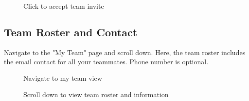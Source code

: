 \documentclass{article}
\begin{document}
\begin{figure}[H]
    \centering
    \caption{Click to accept team invite}
\end{figure}

\subsection{Team Roster and Contact}
Navigate to the "My Team" page and scroll down. Here, the team roster includes the email contact for all your teammates. Phone number is optional.

\begin{figure}[H]
    \centering
    \caption{Navigate to my team view}
\end{figure}

\begin{figure}[H]
    \centering
    \caption{Scroll down to view team roster and information}
\end{figure}
\end{document}

